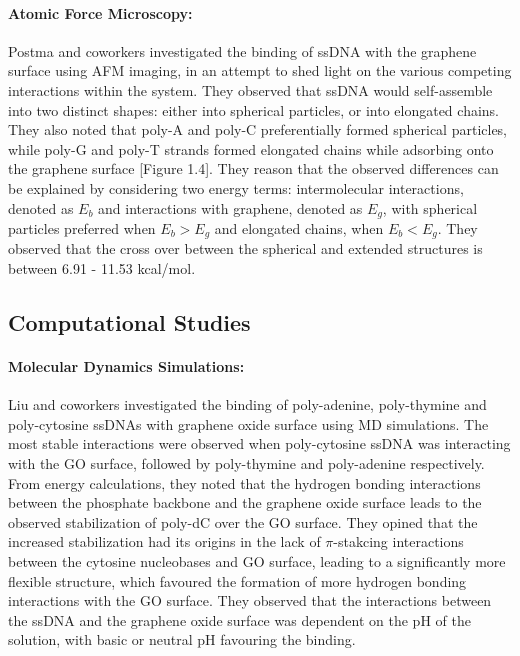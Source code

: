 \paragraph{Atomic Force Microscopy:}Postma and coworkers investigated the binding of ssDNA with the graphene surface using AFM imaging, in an attempt to shed light on the various competing interactions within the system.\supercite{akca_competing_2011} They observed that ssDNA would self-assemble into two distinct shapes: either into spherical particles, or into elongated chains. They also noted that poly-A and poly-C preferentially formed spherical particles, while poly-G and poly-T strands formed elongated chains while adsorbing onto the graphene surface [Figure 1.4]. They reason that the observed differences can be explained by considering two energy terms: intermolecular interactions, denoted as $E_b$ and interactions with graphene, denoted as $E_g$, with spherical particles preferred when $E_b > E_g$ and elongated chains, when $E_b < E_g$. They observed that the cross over between the spherical and extended structures is between 6.91 - 11.53 kcal/mol.

\subsection{Computational Studies}
\paragraph{Molecular Dynamics Simulations:} Liu and coworkers investigated the binding of poly-adenine, poly-thymine and poly-cytosine ssDNAs with graphene oxide surface using MD simulations.\supercite{lopez_polycytosine_2021} The most stable interactions were observed when poly-cytosine ssDNA was interacting with the GO surface, followed by poly-thymine and poly-adenine respectively. From energy calculations, they noted that the hydrogen bonding interactions between the phosphate backbone and the graphene oxide surface leads to the observed stabilization of poly-dC over the GO surface. They opined that the increased stabilization had its origins in the lack of $\pi$-stakcing interactions between the cytosine nucleobases and GO surface, leading to a significantly more flexible structure, which favoured the formation of more hydrogen bonding interactions with the GO surface. They observed that the interactions between the ssDNA and the graphene oxide surface was dependent on the pH of the solution, with basic or neutral pH favouring the binding.

